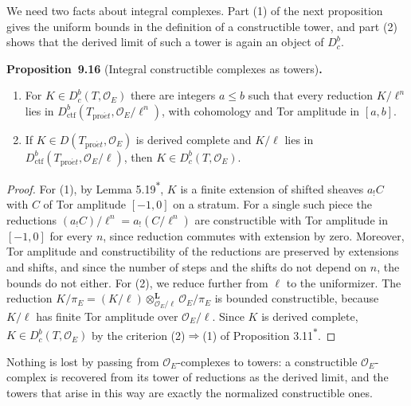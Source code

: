 \documentclass[11pt]{article}
\newenvironment{bpstatement}[2]{\par\addvspace{0.6\baselineskip}\noindent\textbf{#1}#2\textbf{.}\enspace\ignorespaces}
  {\par\addvspace{0.4\baselineskip}}
\newenvironment{bpstatementit}[2]{\begin{bpstatement}{#1}{#2}\itshape\ignorespaces}{\end{bpstatement}}
\newcommand{\bpout}[1]{#1\textsuperscript{\hyperlink{bp-outside}{\ensuremath{\ast}}}}
\providecommand{\Dbc}{}\renewcommand{\Dbc}{D^b_c}
\begin{document}
We need two facts about integral complexes. Part (1) of the next proposition gives the uniform bounds in the definition of a constructible tower, and part (2) shows that the derived limit of such a tower is again an object of \(\Dbc\).

\label{bp52}%
\begin{bpstatementit}{Proposition~9.16}{ (Integral constructible complexes as towers)}
\begin{enumerate}
\item For \(K\in\Dbc(T,\mathcal O_E)\) there are integers \(a\le b\) such that every reduction \(K/\ell^n\) lies in \(D^b_{\mathrm{ctf}}(T_{\mathrm{pro}\acute{e}t},\mathcal O_E/\ell^n)\), with cohomology and Tor amplitude in \([a,b]\).
\item If \(K\in D(T_{\mathrm{pro}\acute{e}t},\mathcal O_E)\) is derived complete and \(K/\ell\) lies in \(D^b_{\mathrm{ctf}}(T_{\mathrm{pro}\acute{e}t},\mathcal O_E/\ell)\), then \(K\in\Dbc(T,\mathcal O_E)\).
\end{enumerate}
\end{bpstatementit}

\begin{proof}[{Proof}]\label{bp53}%
For (1), by Lemma \bpout{5.19}, \(K\) is a finite extension of shifted sheaves \(a_!C\) with \(C\) of Tor amplitude \([-1,0]\) on a stratum. For a single such piece the reductions \((a_!C)/\ell^n=a_!(C/\ell^n)\) are constructible with Tor amplitude in \([-1,0]\) for every \(n\), since reduction commutes with extension by zero. Moreover, Tor amplitude and constructibility of the reductions are preserved by extensions and shifts, and since the number of steps and the shifts do not depend on \(n\), the bounds do not either. For (2), we reduce further from \(\ell\) to the uniformizer. The reduction \(K/\pi_E=(K/\ell)\otimes^{\mathbf L}_{\mathcal O_E/\ell}\mathcal O_E/\pi_E\) is bounded constructible, because \(K/\ell\) has finite Tor amplitude over \(\mathcal O_E/\ell\). Since \(K\) is derived complete, \(K\in\Dbc(T,\mathcal O_E)\) by the criterion (2)\(\Rightarrow\)(1) of Proposition \bpout{3.11}.
\end{proof}

\label{bp54}%
Nothing is lost by passing from \(\mathcal O_E\)-complexes to towers: a constructible \(\mathcal O_E\)-complex is recovered from its tower of reductions as the derived limit, and the towers that arise in this way are exactly the normalized constructible ones.
\end{document}
